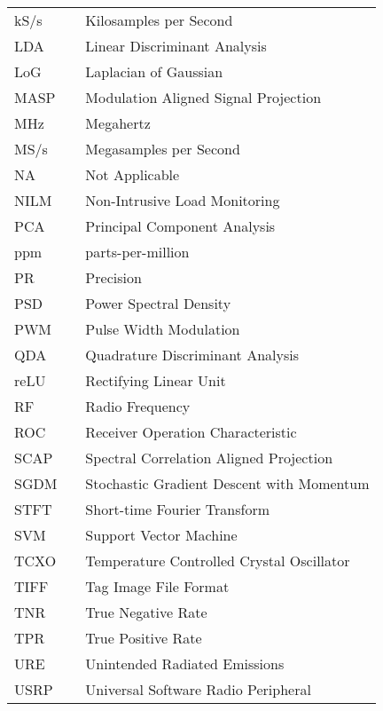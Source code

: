 \documentclass[12pt]{report}
\begin{document}
\begin{longtable}{lcp{4.5in}}
		kS/s && Kilosamples per Second\\
		LDA && Linear Discriminant Analysis\\
		LoG && Laplacian of Gaussian\\
		MASP && Modulation Aligned Signal Projection\\
		MHz && Megahertz\\
		MS/s && Megasamples per Second\\
		NA && Not Applicable\\
		NILM && Non-Intrusive Load Monitoring\\
		PCA && Principal Component Analysis\\
		ppm && parts-per-million\\
		PR && Precision\\
		PSD && Power Spectral Density\\
		PWM && Pulse Width Modulation\\
		QDA && Quadrature Discriminant Analysis\\
		reLU && Rectifying Linear Unit\\
		RF && Radio Frequency\\
		ROC && Receiver Operation Characteristic\\
		SCAP && Spectral Correlation Aligned Projection\\
		SGDM && Stochastic Gradient Descent with Momentum\\
		STFT && Short-time Fourier Transform\\
		SVM && Support Vector Machine\\
		TCXO && Temperature Controlled Crystal Oscillator\\
		TIFF && Tag Image File Format\\
		TNR && True Negative Rate\\
		TPR && True Positive Rate\\
		URE && Unintended Radiated Emissions\\
		USRP && Universal Software Radio Peripheral\\
\end{longtable}

\end{document}

